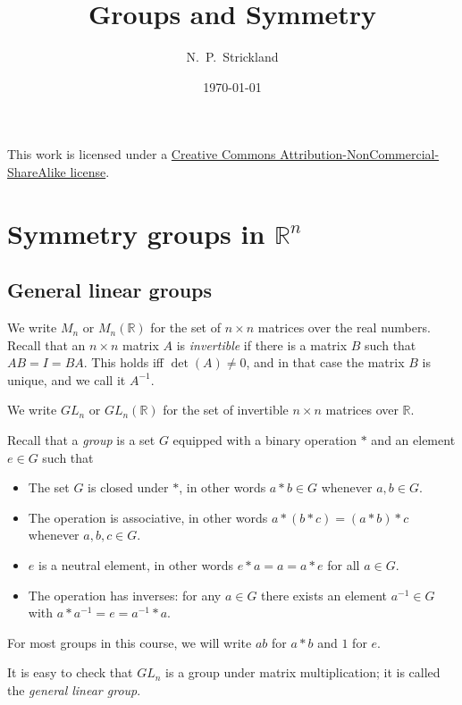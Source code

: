 \documentclass{amsart}
\newcommand{\R}         {{\mathbb{R}}}
\newcommand{\tm}        {\times}
\renewcommand{\:}{\colon}
\theoremstyle{definition}
\begin{document}
\title{Groups and Symmetry}
\author{N.~P.~Strickland}
\date{\today}


\maketitle

\begin{center}
 This work is licensed under a 
 \href{https://creativecommons.org/licenses/by-nc-sa/3.0/deed.en}{
  Creative Commons Attribution-NonCommercial-ShareAlike license}.
 
 \bigskip

 \doclicenseImage 
\end{center}

\section{Symmetry groups in $\R^n$}

\subsection{General linear groups}

We write $M_n$ or $M_n(\R)$ for the set of $n\tm n$ matrices over the
real numbers.  Recall that an $n\tm n$ matrix $A$ is \emph{invertible}
if there is a matrix $B$ such that $AB=I=BA$.  This holds iff
$\det(A)\neq 0$, and in that case the matrix $B$ is unique, and we
call it $A^{-1}$.

We write $GL_n$ or $GL_n(\R)$ for the set of invertible $n\tm n$
matrices over $\R$.

Recall that a \emph{group} is a set $G$ equipped with a binary
operation $*$ and an element $e\in G$ such that
\begin{itemize}
 \item The set $G$ is closed under $*$, in other words $a*b\in G$
  whenever $a,b\in G$.
 \item The operation is associative, in other words
  $a*(b*c)=(a*b)*c$ whenever $a,b,c\in G$.
 \item $e$ is a neutral element, in other words $e*a=a=a*e$ for all
  $a\in G$.
 \item The operation has inverses: for any $a\in G$ there exists an
  element $a^{-1}\in G$ with $a*a^{-1}=e=a^{-1}*a$.
\end{itemize}
For most groups in this course, we will write $ab$ for $a*b$ and $1$
for $e$.

It is easy to check that $GL_n$ is a group under matrix
multiplication; it is called the \emph{general linear group}.
\end{document}
